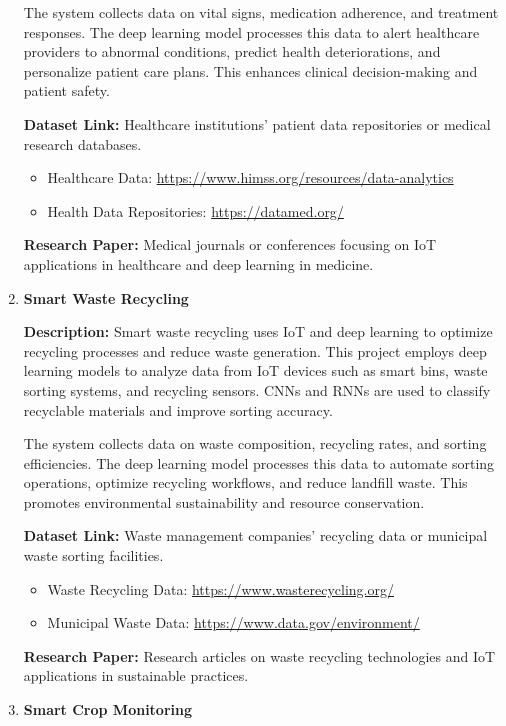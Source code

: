 \documentclass{article}
\begin{document}
\begin{enumerate}[label=\textbf{\arabic*.}, leftmargin=*]
The system collects data on vital signs, medication adherence, and treatment responses. The deep learning model processes this data to alert healthcare providers to abnormal conditions, predict health deteriorations, and personalize patient care plans. This enhances clinical decision-making and patient safety.

\textbf{Dataset Link:} Healthcare institutions' patient data repositories or medical research databases.
\begin{itemize}
    \item Healthcare Data: \url{https://www.himss.org/resources/data-analytics}
    \item Health Data Repositories: \url{https://datamed.org/}
\end{itemize}

\textbf{Research Paper:} Medical journals or conferences focusing on IoT applications in healthcare and deep learning in medicine.

\item \textbf{Smart Waste Recycling}

\textbf{Description:}
Smart waste recycling uses IoT and deep learning to optimize recycling processes and reduce waste generation. This project employs deep learning models to analyze data from IoT devices such as smart bins, waste sorting systems, and recycling sensors. CNNs and RNNs are used to classify recyclable materials and improve sorting accuracy.

The system collects data on waste composition, recycling rates, and sorting efficiencies. The deep learning model processes this data to automate sorting operations, optimize recycling workflows, and reduce landfill waste. This promotes environmental sustainability and resource conservation.

\textbf{Dataset Link:} Waste management companies' recycling data or municipal waste sorting facilities.
\begin{itemize}
    \item Waste Recycling Data: \url{https://www.wasterecycling.org/}
    \item Municipal Waste Data: \url{https://www.data.gov/environment/}
\end{itemize}

\textbf{Research Paper:} Research articles on waste recycling technologies and IoT applications in sustainable practices.

\item \textbf{Smart Crop Monitoring}


\end{enumerate}
\end{document}
